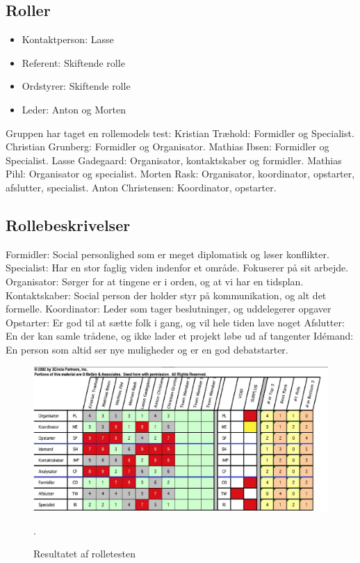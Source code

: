\documentclass[oneside,a4paper,titlepage]{article}
\begin{document}
\subsection*{Roller}
\begin{itemize}
  \item Kontaktperson: Lasse
  \item Referent: Skiftende rolle
  \item Ordstyrer: Skiftende rolle
  \item Leder: Anton og Morten
\end{itemize}
Gruppen har taget en rollemodels test: \newline
Kristian Træhold: Formidler og Specialist. \newline
Christian Grunberg: Formidler og Organisator.\newline
Mathias Ibsen: Formidler og Specialist.\newline
Lasse Gadegaard: Organisator, kontaktskaber og formidler.\newline
Mathias Pihl: Organisator og specialist.\newline
Morten Rask: Organisator, koordinator, opstarter, afslutter, specialist.\newline
Anton Christensen: Koordinator, opstarter.\newline

\subsection*{Rollebeskrivelser}
Formidler: Social personlighed som er meget diplomatisk og løser konflikter.
Specialist: Har en stor faglig viden indenfor et område. Fokuserer på sit arbejde.
Organisator: Sørger for at tingene er i orden, og at vi har en tidsplan.
Kontaktskaber: Social person der holder styr på kommunikation, og alt det formelle.
Koordinator: Leder som tager beslutninger, og uddelegerer opgaver
Opstarter: Er god til at sætte folk i gang, og vil hele tiden lave noget
Afslutter: En der kan samle trådene, og ikke lader et projekt løbe ud af tangenter
Idémand: En person som altid ser nye muligheder og er en god debatstarter.

\begin{figure}[H]
   \centering
   \includegraphics[width=15cm]{./../graphics/rolletest}
   \caption{Resultatet af rolletesten}.
\end{figure}
\end{document}
